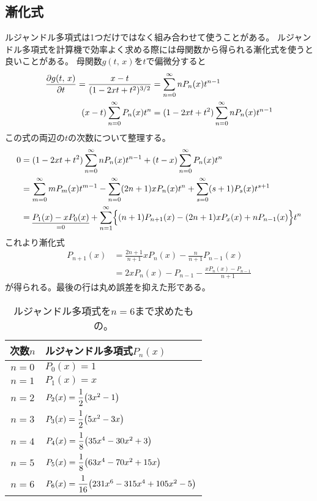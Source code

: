 \documentclass[../../master.tex]{subfiles}
\begin{document}
\subsection{漸化式}
ルジャンドル多項式は1つだけではなく組み合わせて使うことがある。
ルジャンドル多項式を計算機で効率よく求める際には母関数から得られる漸化式を使うと良いことがある。
母関数\(g(t,\,x)\)を\(t\)で偏微分すると
\begin{align}
	\pdv{g(t,\,x)}{t} = \frac{x-t}{(1-2xt+t^2)^{3/2}} & = \sum_{n=0}^{\infty} nP_n(x)t^{n-1}            \\
	(x-t)\sum_{n=0}^{\infty} P_n(x) t^n               & = (1-2xt+t^2)\sum_{n=0}^{\infty} nP_n(x)t^{n-1} \\
\end{align}
この式の両辺の\(t\)の次数について整理する。
\begin{align}
	0 & = (1-2xt+t^2)\sum_{n=0}^{\infty} nP_n(x)t^{n-1} +(t-x)\sum_{n=0}^{\infty} P_n(x) t^n \\
	  & = \sum_{m=0}^{\infty} mP_m(x)t^{m-1}
	- \sum_{n=0}^{\infty}(2n+1)xP_n(x)t^n
	+ \sum_{s=0}^{\infty} (s+1)P_s(x)t^{s+1}                                                 \\
	  & = \underset{=0}{\underline{P_1(x) -xP_0(x)}}+
	\sum_{n=1}^{\infty} \Bigl\{
	(n+1)P_{n+1}(x) - (2n+1)xP_x(x) + nP_{n-1}(x)
	\Bigr\}t^n
\end{align}
これより漸化式
\begin{align}
	P_{n+1}(x) & = \frac{2n+1}{n+1}xP_n(x)-\frac{n}{n+1}P_{n-1}(x) \label{eq:legendre_recurrece1} \\
	           & = 2xP_n(x)-P_{n-1} -\frac{xP_n(x)-P_{n-1}}{n+1}
\end{align}
が得られる。最後の行は丸め誤差を抑えた形である。

\begin{table}[htb]
	\centering
	\caption{ルジャンドル多項式を\(n=6\)まで求めたもの。}
	\begin{tabular}{cl}
		\hline
		次数\(n\) & ルジャンドル多項式\(P_n(x)\)                                  \\
		\hline \hline
		\(n=0\) & \(P_0(x)= 1\)\\
		\(n=1\) & \(P_1(x)= x\)\\
		\(n=2\) & \(P_2(x)= \dfrac{1}{2}\qty(3x^2-1)\)
		\rule[-4.5mm]{0mm}{9mm}\\
		\(n=3\) & \(P_3(x)= \dfrac{1}{2}\qty(5x^2-3x)\)
		\rule[-4.5mm]{0mm}{9mm}\\
		\(n=4\) & \(P_4(x)= \dfrac{1}{8}\qty(35x^4-30x^2+3)\)
		\rule[-4.5mm]{0mm}{9mm}\\
		\(n=5\) & \(P_5(x)= \dfrac{1}{8}\qty(63x^4-70x^2+15x)\)
		\rule[-4.5mm]{0mm}{9mm}\\
		\(n=6\) & \(P_6(x)= \dfrac{1}{16}\qty(231x^6-315x^4+105x^2-5)\)
		\rule[-4.5mm]{0mm}{9mm}\\
		\hline
	\end{tabular}
\end{table}
\end{document}
